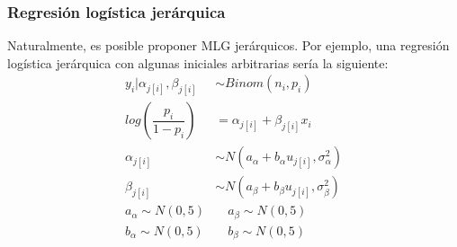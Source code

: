 \begin{table}
\centering
{}
\caption{Ejemplos esquemáticos de regresiones jerárquicas lineales. Fuente: elaboración propia.}
\label{tbl:Regr_Jer_Lineales}
\end{table}

\subsubsection*{Regresión logística jerárquica}

Naturalmente, es posible proponer MLG jerárquicos. Por ejemplo, una regresión logística jerárquica con algunas iniciales arbitrarias sería la siguiente: 
\begin{align*}
y_i|\alpha_{j[i]},\beta_{j[i]} & \sim Binom(n_i,p_i) \\
log\left(\dfrac{p_i}{1-p_i}\right) &= \alpha_{j[i]} + \beta_{j[i]} x_i  \\ 
\alpha_{j[i]} & \sim N(a_{\alpha} + b_{\alpha} u_{j[i]}, \sigma_{\alpha}^2) \\ 
\beta_{j[i]} & \sim N(a_{\beta} + b_{\beta} u_{j[i]}, \sigma_{\beta}^2) \\ 
a_{\alpha} \sim N(0,5) & \quad  a_{\beta} \sim N(0,5) \\
b_{\alpha} \sim N(0,5) & \quad  b_{\beta} \sim N(0,5) 
\end{align*}

